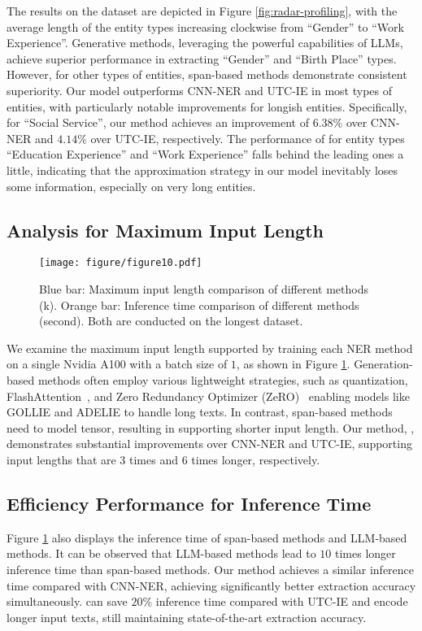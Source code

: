 The results on the \profiling dataset are depicted in Figure \ref{fig:radar-profiling},
with the average length of the entity types increasing clockwise from ``Gender'' to ``Work Experience''. 
Generative methods, leveraging the powerful capabilities of LLMs, achieve superior performance in extracting ``Gender'' and ``Birth Place'' types. 
However, for other types of entities, span-based methods demonstrate consistent superiority. 
Our model \model
outperforms CNN-NER and UTC-IE in most types of entities, with particularly notable improvements for longish entities. 
Specifically, 
for ``Social Service'',
our method achieves an improvement of $6.38\%$ over CNN-NER and $4.14\%$ over UTC-IE, respectively. 
The performance of \model for entity types ``Education Experience'' and ``Work Experience'' falls behind the leading ones a little,
indicating that the approximation strategy in our model inevitably loses some information, especially on very long entities. 

\subsection{Analysis for Maximum Input Length}

\begin{figure}[t]
\centering
\texttt{[image: figure/figure10.pdf]} %
\caption{
Blue bar: Maximum input length comparison of different methods (k).
Orange bar: Inference time comparison of different methods (second).
Both are conducted on the longest \scirex dataset.
}
\label{fig:memory-analysis}
\end{figure}

We examine the maximum input length supported by training each NER method
on a single Nvidia A100 with a batch size of $1$,
as shown in Figure \ref{fig:memory-analysis}. 
Generation-based methods 
often employ various lightweight strategies, such as quantization,  FlashAttention~\cite{dao2022flashattention}, and Zero Redundancy Optimizer (ZeRO)~\cite{rajbhandari2020zero}
enabling models like GOLLIE and ADELIE to handle long texts. 
In contrast, 
span-based methods need to model \tokenspan tensor, 
resulting in supporting shorter input length.
Our method, \model, demonstrates substantial improvements over CNN-NER and UTC-IE, supporting input lengths that are $3$ times and $6$ times longer, respectively.

\subsection{Efficiency Performance for Inference Time}
Figure \ref{fig:memory-analysis} also displays the inference time of span-based methods and LLM-based methods.
It can be observed that LLM-based methods lead to $10$ times longer inference time than span-based methods.
Our method \model achieves a similar inference time compared with CNN-NER, achieving significantly better extraction accuracy simultaneously.
\model can save $20\%$ inference time compared with UTC-IE and encode longer input texts, still maintaining state-of-the-art extraction accuracy.
